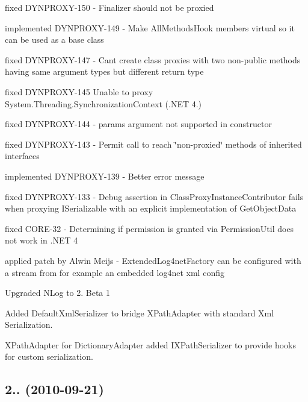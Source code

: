 \begin{DoxyItemize}
\item fixed D\+Y\+N\+P\+R\+O\+X\+Y-\/150 -\/ Finalizer should not be proxied
\item implemented D\+Y\+N\+P\+R\+O\+X\+Y-\/149 -\/ Make All\+Methods\+Hook members virtual so it can be used as a base class
\item fixed D\+Y\+N\+P\+R\+O\+X\+Y-\/147 -\/ Can\textquotesingle{}t create class proxies with two non-\/public methods having same argument types but different return type
\item fixed D\+Y\+N\+P\+R\+O\+X\+Y-\/145 Unable to proxy System.\+Threading.\+Synchronization\+Context (.N\+ET 4.)
\item fixed D\+Y\+N\+P\+R\+O\+X\+Y-\/144 -\/ params argument not supported in constructor
\item fixed D\+Y\+N\+P\+R\+O\+X\+Y-\/143 -\/ Permit call to reach \char`\"{}non-\/proxied\char`\"{} methods of inherited interfaces
\item implemented D\+Y\+N\+P\+R\+O\+X\+Y-\/139 -\/ Better error message
\item fixed D\+Y\+N\+P\+R\+O\+X\+Y-\/133 -\/ Debug assertion in Class\+Proxy\+Instance\+Contributor fails when proxying I\+Serializable with an explicit implementation of Get\+Object\+Data
\item fixed C\+O\+R\+E-\/32 -\/ Determining if permission is granted via Permission\+Util does not work in .N\+ET 4
\item applied patch by Alwin Meijs -\/ Extended\+Log4net\+Factory can be configured with a stream from for example an embedded log4net xml config
\item Upgraded N\+Log to 2. Beta 1
\item Added Default\+Xml\+Serializer to bridge X\+Path\+Adapter with standard Xml Serialization.
\item X\+Path\+Adapter for Dictionary\+Adapter added I\+X\+Path\+Serializer to provide hooks for custom serialization.
\end{DoxyItemize}

\subsection*{2.. (2010-\/09-\/21)}


